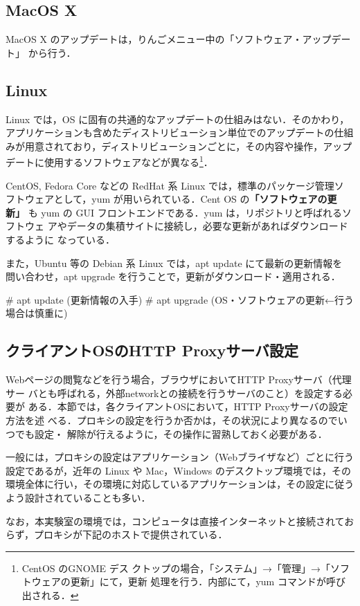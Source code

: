 \subsection*{MacOS X}
MacOS X のアップデートは，りんごメニュー中の「ソフトウェア・アップデート」
から行う．

\subsection*{Linux}
Linux では，OS に固有の共通的なアップデートの仕組みはない．そのかわり，
アプリケーションも含めたディストリビューション単位でのアップデートの仕組
みが用意されており，ディストリビューションごとに，その内容や操作，アップ
デートに使用するソフトウェアなどが異なる\footnote{CentOS のGNOME デス
クトップの場合，「システム」→「管理」→「ソフトウェアの更新」にて，更新
処理を行う．内部にて，yum コマンドが呼び出される．}．

CentOS, Fedora Core などの RedHat 系 Linux では，標準のパッケージ管理ソ
フトウェアとして，yum が用いられている．Cent OS の\textbf{「ソフトウェアの更新」}
も yum の GUI フロントエンドである．yum は，リポジトリと呼ばれるソフトウェ
アやデータの集積サイトに接続し，必要な更新があればダウンロードするように
なっている．

また，Ubuntu 等の Debian 系 Linux では，apt update にて最新の更新情報を
問い合わせ，apt upgrade を行うことで，更新がダウンロード・適用される．
\begin{cli}
# apt update  (更新情報の入手)
# apt upgrade (OS・ソフトウェアの更新←行う場合は慎重に)
\end{cli}

\subsection*{クライアントOSのHTTP Proxyサーバ設定}
Webページの閲覧などを行う場合，ブラウザにおいてHTTP Proxyサーバ（代理サー
バとも呼ばれる，外部networkとの接続を行うサーバのこと）を設定する必要が
ある．本節では，各クライアントOSにおいて，HTTP Proxyサーバの設定方法を述
べる．プロキシの設定を行うか否かは，その状況により異なるのでいつでも設定・
解除が行えるように，その操作に習熟しておく必要がある．

一般には，プロキシの設定はアプリケーション（Webブライザなど）ごとに行う
設定であるが，近年の Linux や Mac，Windows のデスクトップ環境では，その
環境全体に行い，その環境に対応しているアプリケーションは，その設定に従う
よう設計されていることも多い．

なお，本実験室の環境では，コンピュータは直接インターネットと接続されてお
らず，プロキシが下記のホストで提供されている．

